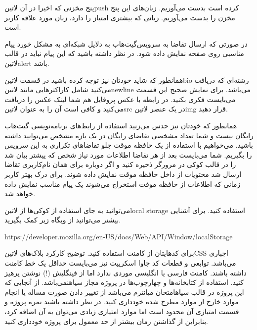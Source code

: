 \documentclass[../main.tex]{subfiles}
\begin{document}
 پنج مخزنی که اخیرا در آن ‌لاتین{push} کرده است بدست می‌آوریم.
 زبان‌های این پنج مخزن را بدست می‌آوریم.
 زبانی که بیشتری امتیاز را دارد، زبان مورد علاقه کاربر است.

در صورتی که ارسال تقاضا به سرویس‌گیت‌هاب به دلایل شبکه‌ای به مشکل خورد پیام مناسبی روی صفحه نمایش داده شود.
در نظر داشته باشید که این پیام نباید در قالب ‌لاتین{alert} باشد.

همانطور که شاید خودتان نیز توجه کرده باشید در قسمت ‌لاتین{bio} رشته‌ای که دریافت می‌کنید شامل کاراکترهایی مانند ‌لاتین{newline} می‌باشد. برای نمایش صحیح این قسمت می‌بایست فکری بکنید.
در رابطه با عکس پروفایل هم شما لینک عکس را دریافت می‌کنید و کافی است آن را به عنوان ‌لاتین{src} در یک عنصر ‌لاتین{img} قرار دهید.

همانطور که خودتان نیز حدس می‌زنید استفاده از رابط‌های برنامه‌نویسی گیت‌هاب رایگان نیست و شما تعداد مشخصی تقاضای رایگان در یک بازه مشخص می‌توانید داشته
باشید. می‌خواهیم با استفاده از یک حافظه موقت جلو تقاضاهای تکراری به این سرویس را بگیریم. شما می‌بایست بعد از هر تقاضا اطلاعات مورد نیاز شخص که پیشتر
بیان شد را در قالب کوکی در مرورگر ذخیره کنید و اگر دوباره برای همان نام‌کاربری تقاضا ارسال شد محتویات از داخل حافظه موقت نمایش داده شوند.
برای درک بهتر کاربر زمانی که اطلاعات از حافظه موقت استخراج می‌شوند یک پیام مناسب نمایش داده خواهد شد.

می‌توانید به جای استفاده از کوکی‌ها از ‌لاتین{local storage} استفاده کنید. برای آشنایی بیشتر می‌توانید از وبگاه زیر کمک بگیرید.


\begin{latin}\begin{center}
https://developer.mozilla.org/en-US/docs/Web/API/Window/localStorage
\end{center}\end{latin}



     برای کدهایتان از کامنت استفاده کنید. توضیح کارکرد بلاک‌های ‌لاتین{CSS} اجباری می‌باشد. توابعی و قطعات کد جاوا اسکریپت نیز می‌بایست حداقل یک خط کامنت داشته باشند.
     کامنت فارسی یا انگلیسی موردی ندارد اما از فینگلیش (!) نوشتن پرهیز کنید.
     استفاده از کتابخانه‌ها و چهارچوب‌ها در پروژه مجاز ‌سیاه{نمی‌باشد}.
     از آنجایی که این پروژه در قالب ‌سیاه{امتحان میانترم} می‌باشد از تغییر دادن صورت مساله یا انجام موارد خارج از موارد مطرح شده خودداری کنید.
     در نظر داشته باشید نمره پروژه و قسمت امتیازی آن محدود است اما موارد امتیازی زیادی می‌توان به آن اضافه کرد، بنابراین از گذاشتن زمان بیشتر از حد معمول برای پروژه خودداری کنید.
\end{document}
